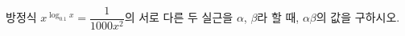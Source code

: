 방정식 $x^{\log_{0.1} x}=\dfrac{1}{1000x^2}$의 서로 다른 두 실근을 $\alpha$, $\beta$라 할 때, $\alpha\beta$의 값을 구하시오.

